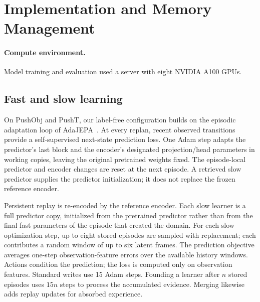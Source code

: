 \section{Implementation and Memory Management}
\label{app:implementation}

\paragraph{Compute environment.}
Model training and evaluation used a server with eight NVIDIA A100 GPUs.

\subsection{Fast and slow learning}
On PushObj and PushT, our label-free configuration builds on the episodic adaptation loop of AdaJEPA~. At every replan, recent observed transitions provide a self-supervised next-state prediction loss. One Adam step adapts the predictor's last block and the encoder's designated projection/head parameters in working copies, leaving the original pretrained weights fixed. The episode-local predictor and encoder changes are reset at the next episode. A retrieved slow predictor supplies the predictor initialization; it does not replace the frozen reference encoder.

Persistent replay is re-encoded by the reference encoder. Each slow learner is a full predictor copy, initialized from the pretrained predictor rather than from the final fast parameters of the episode that created the domain. For each slow optimization step, up to eight stored episodes are sampled with replacement; each contributes a random window of up to six latent frames. The prediction objective averages one-step observation-feature errors over the available history windows. Actions condition the prediction; the loss is computed only on observation features. Standard writes use 15 Adam steps. Founding a learner after $n$ stored episodes uses $15n$ steps to process the accumulated evidence. Merging likewise adds replay updates for absorbed experience.


